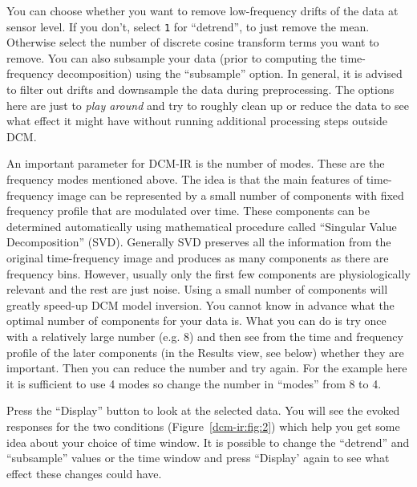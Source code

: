 You can choose whether you want to remove low-frequency drifts of the data at sensor level. If you don't, select \texttt{1} for ``detrend'', to just remove the mean. Otherwise select the number of discrete cosine transform terms you want to remove. You can also subsample your data (prior to computing the time-frequency decomposition) using the ``subsample'' option. In general, it is advised to filter out drifts and downsample the data during preprocessing. The options here are just to \textit{play around} and try to roughly clean up or reduce the data to see what effect it might have without running additional processing steps outside DCM.

An important parameter for DCM-IR is the number of modes. These are the frequency modes mentioned above. The idea is that the main features of time-frequency image can be represented by a small number of components with fixed frequency profile that are modulated over time. These components can be determined automatically using mathematical procedure called ``Singular Value Decomposition'' (SVD). Generally SVD preserves all the information from the original time-frequency image and produces as many components as there are frequency bins. However, usually only the first few components are physiologically relevant and the rest are just noise. Using a small number of components will greatly speed-up DCM model inversion. You cannot know in advance what the optimal number of components for your data is. What you can do is try once with a relatively large number (e.g. 8) and then see from the time and frequency profile of the later components (in the Results view, see below) whether they are important. Then you can reduce the number and try again. For the example here it is sufficient to use 4 modes so change the number in ``modes'' from 8 to 4. 

Press the ``Display'' button to look at the selected data. You will see the evoked responses for the two conditions (Figure~\ref{dcm-ir:fig:2}) which help you get some idea about your choice of time window. It is possible to change the ``detrend'' and ``subsample'' values or the time window and press ``Display' again to see what effect these changes could have. 

